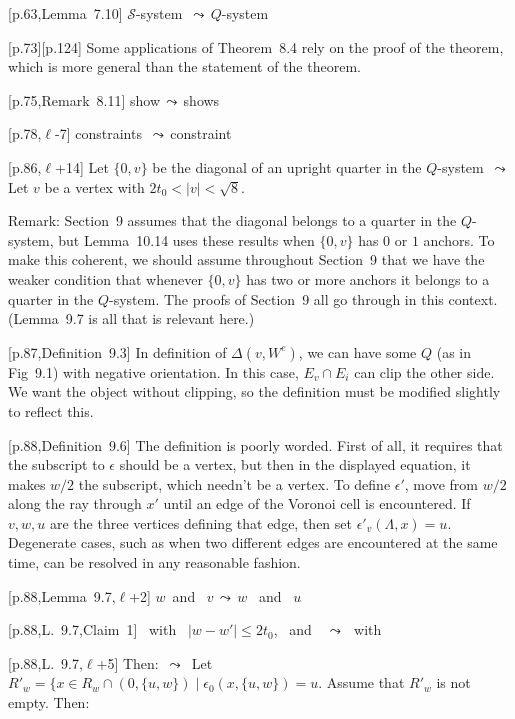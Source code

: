 \documentclass[11pt]{amsart}
\def\lto{\ensuremath{\,\leadsto\,}}
\def\line{$\ell$}
\def\text{\hbox}
\begin{document}
[p.63,Lemma~7.10]
	${\mathcal S}$-system \lto $Q$-system
	
[p.73][p.124] Some applications of Theorem~8.4 rely on
the proof of the theorem, which is more general than
the statement of the theorem.  

[p.75,Remark~8.11]
	show\lto shows

[p.78,\line-7] constraints \lto constraint

[p.86,\line+14] Let $\{0,v\}$ be 
          the diagonal of an upright quarter in the $Q$-system
        \lto
       Let $v$ be a vertex with $2t_0<|v|<\sqrt8$.
	
          Remark: Section~9 assumes that the diagonal belongs to
          a quarter in the $Q$-system, but Lemma~10.14 uses these
          results when $\{0,v\}$ has $0$ or $1$ anchors.  To make
          this coherent, we should assume throughout Section~9 that
          we have the weaker condition that whenever $\{0,v\}$ has
          two or more anchors it belongs to a quarter in the $Q$-system.
          The proofs of Section~9 all go through in this context.
          (Lemma~9.7 is all that is relevant here.)

[p.87,Definition~9.3]
	In definition of $\Delta(v,W^e)$, we
	can have some $Q$ (as in Fig~9.1)
	with negative orientation.
	In this case, $E_v\cap E_i$ can clip
	the other side.  We want the object
	without clipping, so the definition must
	be modified slightly to reflect this.
	
[p.88,Definition~9.6]
	The definition is poorly worded.  First of
	all, it requires that the subscript to
	$\epsilon$ should be a vertex, but then in
	the displayed equation, it makes $w/2$ the
	subscript, which needn't be a vertex.  To
	define $\epsilon'$, move from $w/2$ along
	the ray through $x'$ until an edge of the
	Voronoi cell is encountered.  If $v,w,u$
	are the three vertices defining that edge,
	then set $\epsilon'_v(\Lambda,x)=u$.
	Degenerate cases, such as when two different
	edges are encountered at the same time,
	can be resolved in any reasonable fashion.
	
[p.88,Lemma~9.7,\line+2] 
	$w$\text{ and } $v$\lto $w$ \text{ and } $u$

	
[p.88,L.~9.7,Claim~1]
	\text{ with } $|w - w'|\le 2t_0$, \text{ and }
	\lto \text{ with }

	
[p.88,L.~9.7,\line+5]
         Then: $\lto$ Let
          $
          R'_w = \{x\in R_w \cap(0,\{u,w\})\mid 
          \epsilon_0(x,\{u,w\}) = u.
          $
          Assume that $R'_w$ is not empty. Then:
\end{document}
